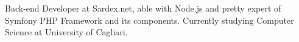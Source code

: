 


\begin{cvparagraph}

Back-end Developer at Sardex.net, able with Node.js and pretty expert of Symfony PHP Framework and its components.
Currently studying Computer Science at University of Cagliari.
\end{cvparagraph}